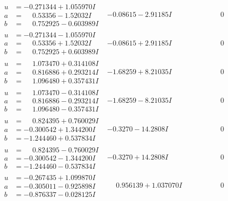 \documentclass[1p]{elsarticle_modified}
\theoremstyle{definition}
\begin{document}
$$\begin{array}{c|c|c}
\begin{aligned}
u &= -0.271344 + 1.055970 I \\
a &= \phantom{-}0.53356 - 1.52032 I \\
b &= \phantom{-}0.752925 - 0.603989 I\end{aligned}
 & -0.08615 - 2.91185 I & \phantom{-0.000000 } 0 \\ \hline\begin{aligned}
u &= -0.271344 - 1.055970 I \\
a &= \phantom{-}0.53356 + 1.52032 I \\
b &= \phantom{-}0.752925 + 0.603989 I\end{aligned}
 & -0.08615 + 2.91185 I & \phantom{-0.000000 } 0 \\ \hline\begin{aligned}
u &= \phantom{-}1.073470 + 0.314108 I \\
a &= \phantom{-}0.816886 + 0.293214 I \\
b &= \phantom{-}1.096480 + 0.357431 I\end{aligned}
 & -1.68259 + 8.21035 I & \phantom{-0.000000 } 0 \\ \hline\begin{aligned}
u &= \phantom{-}1.073470 - 0.314108 I \\
a &= \phantom{-}0.816886 - 0.293214 I \\
b &= \phantom{-}1.096480 - 0.357431 I\end{aligned}
 & -1.68259 - 8.21035 I & \phantom{-0.000000 } 0 \\ \hline\begin{aligned}
u &= \phantom{-}0.824395 + 0.760029 I \\
a &= -0.300542 + 1.344200 I \\
b &= -1.244460 + 0.537834 I\end{aligned}
 & -0.3270 - 14.2808 I & \phantom{-0.000000 } 0 \\ \hline\begin{aligned}
u &= \phantom{-}0.824395 - 0.760029 I \\
a &= -0.300542 - 1.344200 I \\
b &= -1.244460 - 0.537834 I\end{aligned}
 & -0.3270 + 14.2808 I & \phantom{-0.000000 } 0 \\ \hline\begin{aligned}
u &= -0.267435 + 1.099870 I \\
a &= -0.305011 - 0.925898 I \\
b &= -0.876337 - 0.028125 I\end{aligned}
 & \phantom{-}0.956139 + 1.037070 I & \phantom{-0.000000 } 0 \\ \hline\begin{aligned}

\end{aligned}
\end{array}$$
\end{document}
